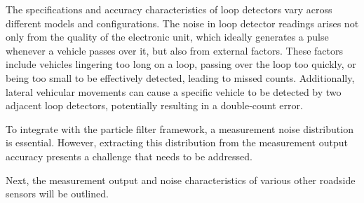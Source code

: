 The specifications and accuracy characteristics of loop detectors vary across different models and configurations. The noise in loop detector readings arises not only from the quality of the electronic unit, which ideally generates a pulse whenever a vehicle passes over it, but also from external factors. These factors include vehicles lingering too long on a loop, passing over the loop too quickly, or being too small to be effectively detected, leading to missed counts. Additionally, lateral vehicular movements can cause a specific vehicle to be detected by two adjacent loop detectors, potentially resulting in a double-count error.

To integrate with the particle filter framework, a measurement noise distribution is essential. However, extracting this distribution from the measurement output accuracy presents a challenge that needs to be addressed.

Next, the measurement output and noise characteristics of various other roadside sensors will be outlined.



